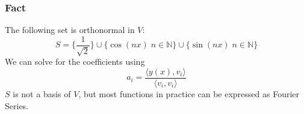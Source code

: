 \documentclass{article}
\newtheorem{one minute paper}[theorem]{One Minute Paper}
\begin{document}
\subsubsection*{Fact}
The following set is orthonormal in $V$:
\begin{equation}
    S = \{\frac{1}{\sqrt{2}}\} \cup \{\cos(nx) \; n \in \mathbb{N}\} \cup \{\sin(nx) \; n \in \mathbb{N}\}
\end{equation}
We can solve for the coefficients using 
\begin{equation}
    a_i = \frac{\langle y(x), v_i \rangle}{\langle v_i, v_i \rangle}
\end{equation}
$S$ is not a basis of $V$, but most functions in practice can be expressed as Fourier Series. 
\end{document}
